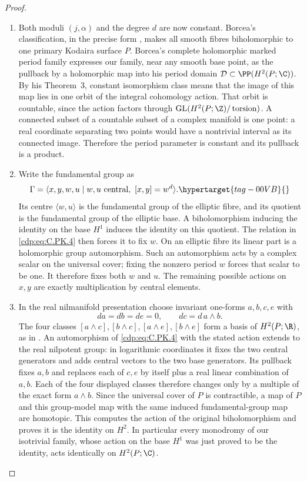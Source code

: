 \begin{proof}
\begin{enumerate}[leftmargin=*]
\item Both moduli $(j,\alpha)$ and the degree $d$ are now
constant. Borcea's classification, in the precise form
\cite[\S1]{SS2002}, makes all smooth fibres biholomorphic
to one primary Kodaira surface $P$. Borcea's complete
holomorphic marked period family \cite[Remark~1]{Borcea1984}
expresses our family, near any smooth base point, as the
pullback by a holomorphic map into his period domain
$\mathcal D\subset\PP(H^2(P;\C))$. By his Theorem~3,
constant isomorphism class means that the image of this
map lies in one orbit of the integral cohomology action.
That orbit is countable, since the action factors through
$\operatorname{GL}(H^2(P;\Z)/\operatorname{torsion})$.
A connected subset of a countable subset of a complex
manifold is one point: a real coordinate separating two
points would have a nontrivial interval as its connected
image. Therefore the period parameter is constant and
its pullback is a product. 
\item Write the fundamental group as
\begin{equation}
 \Gamma=\langle x,y,w,u\mid
       w,u\text{ central},\ [x,y]=w^d\rangle.
\hypertarget{tag-00VB}{}\label{cdp:eq:C.PK.4}
\end{equation}
Its centre $\langle w,u\rangle$ is the fundamental group
of the elliptic fibre, and its quotient is the fundamental
group of the elliptic base. A biholomorphism inducing the
identity on the base $H^1$ induces the identity on this
quotient. The relation in \eqref{cdp:eq:C.PK.4} then forces it to fix
$w$. On an elliptic fibre its linear part is a holomorphic
group automorphism. Such an automorphism acts by a complex
scalar on the universal cover; fixing the nonzero period
$w$ forces that scalar to be one. It therefore fixes both
$w$ and $u$. The remaining possible actions on $x,y$ are
exactly multiplication by central elements.

\item In the real
nilmanifold presentation choose invariant one-forms
$a,b,c,e$ with
\[
 da=db=de=0,\qquad dc=d\,a\wedge b.
\]
The four classes $[a\wedge c],[b\wedge c],
[a\wedge e],[b\wedge e]$ form a basis of
$H^2(P;\R)$, as in \cite[\S3]{Borcea1984}.
An automorphism of \eqref{cdp:eq:C.PK.4} with the stated action extends
to the real nilpotent group: in logarithmic coordinates it
fixes the two central generators and adds central vectors
to the two base generators. Its pullback fixes $a,b$ and
replaces each of $c,e$ by itself plus a real linear
combination of $a,b$. Each of the four displayed classes
therefore changes only by a multiple of the exact form
$a\wedge b$. Since the universal cover of $P$ is
contractible, a map of $P$ and this group-model map with
the same induced fundamental-group map are homotopic.
This computes the action of the original biholomorphism
and proves it is the identity on $H^2$.
In particular every monodromy of our isotrivial family,
whose action on the base $H^1$ was just proved to be the
identity, acts identically on $H^2(P;\C)$.


\end{enumerate}
\end{proof}
